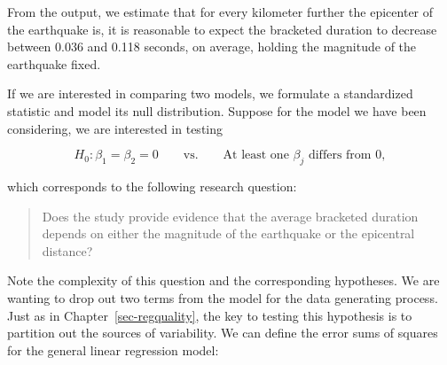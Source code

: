 \documentclass[
  letterpaper,
  DIV=11,
  numbers=noendperiod]{scrreprt}
\theoremstyle{plain}
\theoremstyle{definition}
\theoremstyle{definition}
\theoremstyle{remark}
\begin{document}
\begin{table}

\caption{\label{tbl-regextensions-ci}Summary the linear model fit
relating the bracketed duration at locations in Greece following an
earthquake with the magnitude of the event and the distance of the
location from the center of the earthquake.}


\end{table}%

From the output, we estimate that for every kilometer further the
epicenter of the earthquake is, it is reasonable to expect the bracketed
duration to decrease between 0.036 and 0.118 seconds, on average,
holding the magnitude of the earthquake fixed.

If we are interested in comparing two models, we formulate a
standardized statistic and model its null distribution. Suppose for the
model we have been considering, we are interested in testing

\[H_0: \beta_1 = \beta_2 = 0 \qquad \text{vs.} \qquad \text{At least one } \beta_j \text{ differs from 0},\]

which corresponds to the following research question:

\begin{quote}
Does the study provide evidence that the average bracketed duration
depends on either the magnitude of the earthquake or the epicentral
distance?
\end{quote}

Note the complexity of this question and the corresponding hypotheses.
We are wanting to drop out two terms from the model for the data
generating process. Just as in Chapter~\ref{sec-regquality}, the key to
testing this hypothesis is to partition out the sources of variability.
We can define the error sums of squares for the general linear
regression model:
\end{document}
